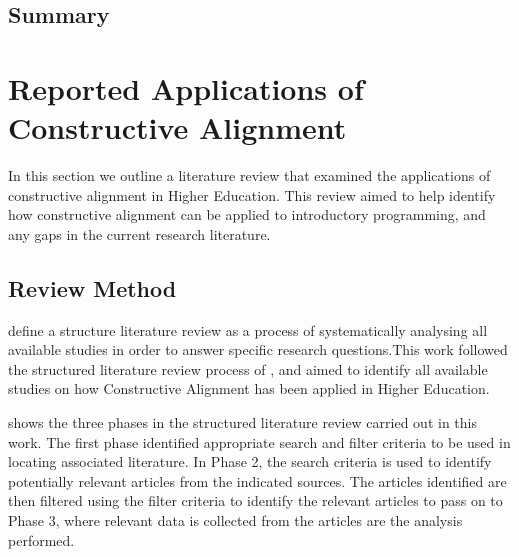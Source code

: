 \citet{Biggs:2007}

\citet{Biggs:1996c} \citet{Biggs:1997}


\subsection{Summary} %
\label{sub:ca_summary}




\clearpage
\section{Reported Applications of Constructive Alignment} %
\label{sec:reported_applications_of_constructive_alignment}

In this section we outline a literature review that examined the applications of constructive alignment in Higher Education. This review aimed to help identify how constructive alignment can be applied to introductory programming, and any gaps in the current research literature. 

\subsection{Review Method} %
\label{sub:review_method}

\citet{Petticrew:2008} define a structure literature review as a process of systematically analysing all available studies in order to answer specific research questions.This work followed the structured literature review process of \citet{Kitchenham:2004}, and aimed to identify all available studies on how Constructive Alignment has been applied in Higher Education.

 shows the three phases in the structured literature review carried out in this work. The first phase identified appropriate search and filter criteria to be used in locating associated literature. In Phase 2, the search criteria is used to identify potentially relevant articles from the indicated sources. The articles identified are then filtered using the filter criteria to identify the relevant articles to pass on to Phase 3, where relevant data is collected from the articles are the analysis performed.

